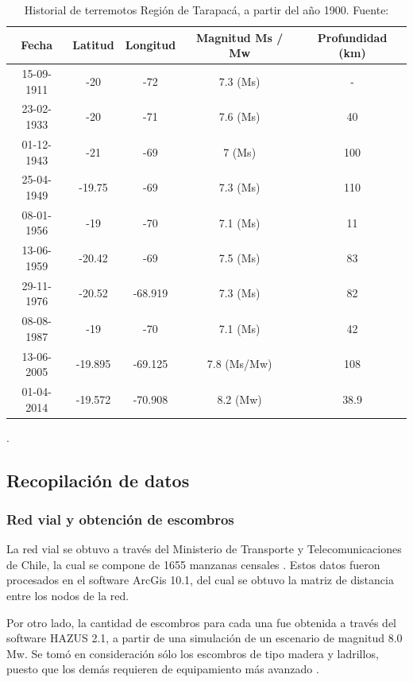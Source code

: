 \documentclass[letterpaper,conference]{IEEEtran}
\begin{document}
\begin{table}[h!]
\resizebox{9cm}{!} {
	\centering
	\begin{tabular}{c|c|c|c|c} \hline
	Fecha	& Latitud &	Longitud & Magnitud  Ms / Mw & Profundidad (km) \\ \hline
	15-09-1911  & -20	& -72 	 & 7.3 (Ms) & - \\ 
	23-02-1933  & -20   & -71	 & 7.6 (Ms) & 40  \\ 
	01-12-1943  & -21	& -69    & 7   (Ms) & 100 \\ 
	25-04-1949	& -19.75& -69	 & 7.3 (Ms) & 110 \\ 
	08-01-1956	& -19   & -70	 & 7.1 (Ms) & 11 \\ 
	13-06-1959	& -20.42& -69 	 & 7.5 (Ms) & 83 \\ 
	29-11-1976 	& -20.52& -68.919& 7.3 (Ms) & 82  \\ 
	08-08-1987	& -19	& -70	 & 7.1 (Ms) & 42  \\ 
	13-06-2005	& -19.895&-69.125& 7.8 (Ms/Mw) & 108 \\ 
	01-04-2014	& -19.572&-70.908& 8.2 (Mw) & 38.9  \\ \hline
	\end{tabular}
	}
	\caption{Historial de terremotos Región de Tarapacá, a partir del año 1900. Fuente: \citep{guc}}.
	\label{tab:tab1} 
\end{table}

\subsection{Recopilación de datos}

\subsubsection{Red vial y obtención de escombros}

La red vial se obtuvo a través del Ministerio de Transporte y Telecomunicaciones de Chile, la cual se compone de 1655 manzanas censales \citet{CENSO2017}. Estos datos fueron procesados en el software ArcGis 10.1, del cual se obtuvo la matriz de distancia entre los nodos de la red.

Por otro lado, la cantidad de escombros para cada una fue obtenida a través del software HAZUS 2.1, a partir de una simulación de un escenario de magnitud 8.0 Mw. Se tomó en consideración sólo los escombros de tipo madera y ladrillos, puesto que los demás requieren de equipamiento más avanzado \citep{hasuz}.
\end{document}
